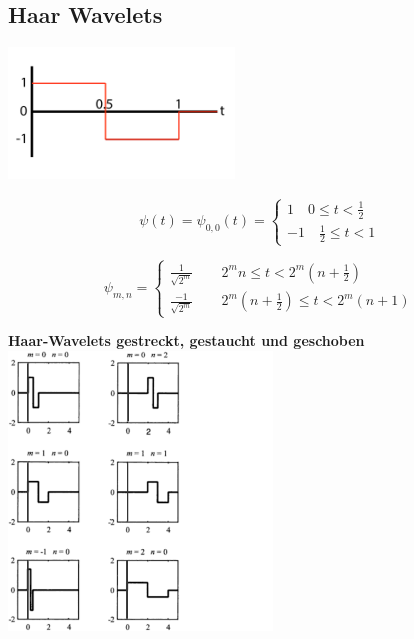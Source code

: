 \subsection{Haar Wavelets }
\begin{center}
	\begin{minipage}[c]{0.65\textwidth}
    \begin{center}
    \includegraphics[width=6cm]{content/HaarWavelet.pdf}
    \end{center}
    \[
      \psi(t) = \psi_{0,0}(t)=\begin{cases} 1 \quad 0 \leq t < \frac{1}{2}\\ -1 \quad \frac{1}{2} \leq t < 1  \end{cases}
    \]
    
    \[	\psi_{m,n}  = \begin{cases} 
    	\frac{1}{\sqrt{2^m}} \qquad 2^m n \leq t < 2^m(n+\frac{1}{2}) \\ 
    	\frac{-1}{\sqrt{2^m}} \qquad 2^m(n+\frac{1}{2}) \leq t < 2^m(n+1)
    	\end{cases}
    \]
    
	\end{minipage}
	\begin{minipage}{0.3\textwidth}
	\textbf{Haar-Wavelets gestreckt, gestaucht und geschoben}\\
	\includegraphics[width=7cm]{./content/HaarStretchedMoved}
	\end{minipage}
\end{center}



